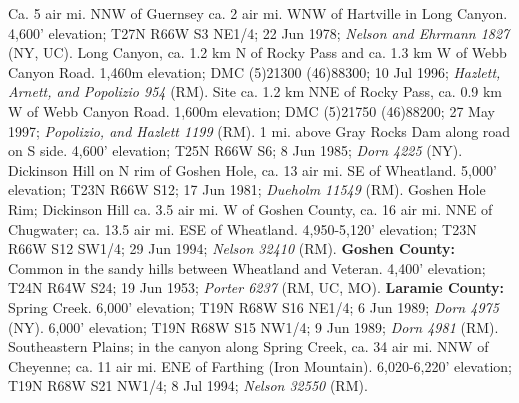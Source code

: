 Ca. 5 air mi. NNW of Guernsey ca. 2 air mi. WNW of Hartville in Long Canyon. 4,600' elevation; T27N R66W S3 NE1/4; 22 Jun 1978; \textit{Nelson and Ehrmann 1827} (NY, UC).
Long Canyon, ca. 1.2 km N of Rocky Pass and ca. 1.3 km W of Webb Canyon Road. 1,460m elevation; DMC (5)21300 (46)88300; 10 Jul 1996; \textit{Hazlett, Arnett, and Popolizio 954} (RM).
Site ca. 1.2 km NNE of Rocky Pass, ca. 0.9 km W of Webb Canyon Road. 1,600m elevation; DMC (5)21750 (46)88200; 27 May 1997; \textit{Popolizio, and Hazlett 1199} (RM).
1 mi. above Gray Rocks Dam along road on S side. 4,600' elevation; T25N R66W S6; 8 Jun 1985; \textit{Dorn 4225} (NY).
Dickinson Hill on N rim of Goshen Hole, ca. 13 air mi. SE of Wheatland. 5,000' elevation; T23N R66W S12; 17 Jun 1981; \textit{Dueholm 11549} (RM).
Goshen Hole Rim; Dickinson Hill ca. 3.5 air mi. W of Goshen County, ca. 16 air mi. NNE of Chugwater; ca. 13.5 air mi. ESE of Wheatland. 4,950-5,120' elevation; T23N R66W S12 SW1/4; 29 Jun 1994; \textit{Nelson 32410} (RM).
  \textbf{Goshen County:}
  Common in the sandy hills between Wheatland and Veteran. 4,400' elevation; T24N R64W S24; 19 Jun 1953; \textit{Porter 6237} (RM, UC, MO).
  \textbf{Laramie County:}
Spring Creek. 6,000' elevation; T19N R68W S16 NE1/4; 6 Jun 1989; \textit{Dorn 4975} (NY).
6,000' elevation; T19N R68W S15 NW1/4; 9 Jun 1989; \textit{Dorn 4981} (RM).
Southeastern Plains; in the canyon along Spring Creek, ca. 34 air mi. NNW of Cheyenne; ca. 11 air mi. ENE of Farthing (Iron Mountain). 6,020-6,220' elevation; T19N R68W S21 NW1/4; 8 Jul 1994; \textit{Nelson 32550} (RM).
